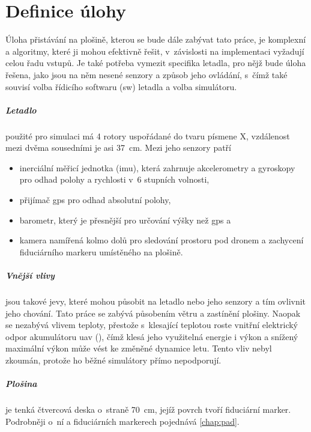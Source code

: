 \chapter{Definice úlohy} \label{chap:task}
Úloha přistávání na plošině, kterou se bude dále zabývat tato práce, je komplexní a algoritmy, které ji mohou efektivně řešit, v~závislosti na implementaci vyžadují celou řadu vstupů. Je také potřeba vymezit specifika letadla, pro nějž bude úloha řešena, jako jsou na něm nesené senzory a způsob jeho ovládání, s~čímž také souvisí volba řídicího softwaru (\acrshort{sw}) letadla a volba simulátoru.

\paragraph{Letadlo} použité pro simulaci má 4 rotory uspořádané do tvaru písmene X, vzdálenost mezi dvěma sousedními je asi 37~cm. Mezi jeho senzory patří \begin{itemize}
    \item inerciální měřicí jednotka (\acrshort{imu}), která zahrnuje akcelerometry a gyroskopy pro odhad polohy a rychlosti v~6 stupních volnosti, 
    \item přijímač \acrshort{gps} pro odhad absolutní polohy, 
    \item barometr, který je přesnější pro určování výšky než \acrshort{gps} a 
    \item kamera namířená kolmo dolů pro sledování prostoru pod dronem a zachycení fiduciárního markeru umístěného na plošině.
\end{itemize}

\paragraph{Vnější vlivy} jsou takové jevy, které mohou působit na letadlo nebo jeho senzory a tím ovlivnit jeho chování. Tato práce se zabývá působením větru a zastínění plošiny. Naopak se nezabývá vlivem teploty, přestože s~klesající teplotou roste vnitřní elektrický odpor akumulátoru \acrshort{uav} (\cite{lipo}), čímž klesá jeho využitelná energie i výkon a snížený maximální výkon může vést ke změněné dynamice letu. Tento vliv nebyl zkoumán, protože ho běžné simulátory přímo nepodporují.

\paragraph{Plošina} je tenká čtvercová deska o~straně 70~cm, jejíž povrch tvoří fiduciární marker. Podrobněji o~ní a fiduciárních markerech pojednává \cref{chap:pad}.

